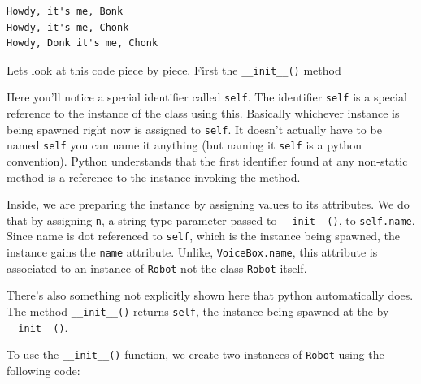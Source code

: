 \begin{verbatim}
Howdy, it's me, Bonk
Howdy, it's me, Chonk
Howdy, Donk it's me, Chonk
\end{verbatim}

Lets look at this code piece by piece. First the \texttt{\_\_init\_\_()}
method

\begin{Shaded}
\begin{Highlighting}[]
 \NormalTok{(}\NormalTok{):}
    \OperatorTok{=}
\end{Highlighting}
\end{Shaded}

Here you'll notice a special identifier called \texttt{self}. The
identifier \texttt{self} is a special reference to the instance of the
class using this. Basically whichever instance is being spawned right
now is assigned to \texttt{self}. It doesn't actually have to be named
\texttt{self} you can name it anything (but naming it \texttt{self} is a
python convention). Python understands that the first identifier found
at any non-static method is a reference to the instance invoking the
method.

Inside, we are preparing the instance by assigning values to its
attributes. We do that by assigning \texttt{n}, a string type parameter
passed to \texttt{\_\_init\_\_()}, to \texttt{self.name}. Since name is
dot referenced to \texttt{self}, which is the instance being spawned,
the instance gains the \texttt{name} attribute. Unlike,
\texttt{VoiceBox.name}, this attribute is associated to an instance of
\texttt{Robot} not the class \texttt{Robot} itself.

There's also something not explicitly shown here that python
automatically does. The method \texttt{\_\_init\_\_()} returns
\texttt{self}, the instance being spawned at the by
\texttt{\_\_init\_\_()}.

To use the \texttt{\_\_init\_\_()} function, we create two instances of
\texttt{Robot} using the following code:

\begin{Shaded}
\begin{Highlighting}[]
\OperatorTok{=}\NormalTok{)}
\OperatorTok{=}\NormalTok{)}
\end{Highlighting}
\end{Shaded}

